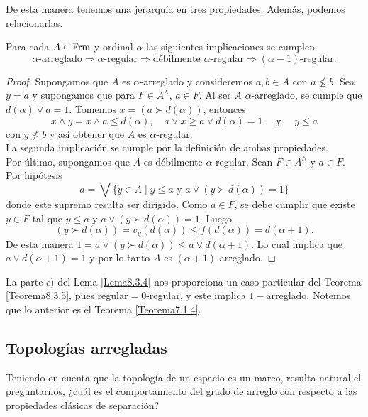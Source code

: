 De esta manera tenemos una jerarquía en tres propiedades. Además, podemos relacionarlas.

\begin{thm}\label{Teorema8.3.5}
    Para cada $A\in \mathrm{Frm}$ y ordinal $\alpha$ las siguientes implicaciones se cumplen
    \[
    \alpha\mbox{-arreglado}\Rightarrow \alpha\mbox{-regular}\Rightarrow \mbox{débilmente }\alpha\mbox{-regular}\Rightarrow (\alpha-1)\mbox{-regular}.
    \]
\end{thm}

\begin{proof}
    Supongamos que $A$ es $\alpha$-arreglado y consideremos $a, b\in A$ con $a\nleq b$. Sea $y=a$ y supongamos que para $F\in A^\wedge$, $a\in F$. Al ser $A$ $\alpha$-arreglado, se cumple que $d(\alpha)\vee a=1$. Tomemos $x=(a\succ d(\alpha))$, entonces 
    \[
    x\wedge y=x\wedge a\leq d(\alpha), \quad a\vee x\geq a\vee d(\alpha)=1\quad \mbox{ y }\quad y\leq a
    \]
    con $y\nleq b$ y así obtener que $A$ es $\alpha$-regular.\\

    La segunda implicación se cumple por la definición de ambas propiedades.\\

    Por último,  supongamos que $A$ es débilmente $\alpha$-regular. Sean $F\in A^\wedge$ y $a\in F$. Por hipótesis
    \[
    a=\bigvee\{y\in A\mid y\leq a \mbox{ y }a\vee (y\succ d(\alpha))=1\}
    \]
    donde este supremo resulta ser dirigido. Como $a\in F$, se debe cumplir que existe $y\in F$ tal que $y\leq a$ y $a\vee (y\succ d(\alpha))=1$. Luego 
    \[
    (y\succ d(\alpha))=v_y(d(\alpha))\leq f(d(\alpha))=d(\alpha+1).
    \]
    De esta manera $1=a\vee  (y\succ d(\alpha))\leq a\vee  d(\alpha+1)$. Lo cual implica que $a\vee d(\alpha+1)=1$ y por lo tanto $A$ es $(\alpha+1)$-arreglado.
\end{proof}

La parte $c)$ del Lema \ref{Lema8.3.4} nos proporciona un caso particular del Teorema \ref{Teorema8.3.5}, pues regular$=0$-regular, y este implica $1-$arreglado. Notemos que lo anterior es el Teorema \ref{Teorema7.1.4}.

\subsection{Topologías arregladas}

Teniendo en cuenta que la topología de un espacio es un marco, resulta natural el preguntarnos, ¿cuál es el comportamiento del grado de arreglo con respecto a las propiedades clásicas de separación?

